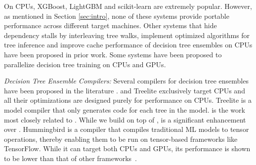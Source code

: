 On CPUs, XGBoost\cite{XGBoost}, LightGBM\cite{LightGBM} and
scikit-learn\cite{Sklearn} are extremely popular. However, 
as mentioned in Section \ref{sec:intro}, none of these systems
provide portable performance across different target machines.
Other systems that hide dependency stalls by interleaving tree walks\cite{VPred},
implement optimized algorithms for tree inference\cite{QuickScorer, QuickScorer1}
and improve cache performance of decision tree ensembles on CPUs\cite{CacheConscious1, CacheConscious2}
have been proposed in prior work.
Some systems have been proposed to parallelize decision tree training 
on CPUs and GPUs\cite{Jansson2014gpuRFAG, Nasridinov2013DecisionTC}.

\emph{Decision Tree Ensemble Compilers:}
Several compilers for decision tree ensembles have been proposed in the 
literature \cite{Treelite, Treebeard, Hummingbird}. \TreebeardOLD{} and Treelite
exclusively target CPUs and all their optimizations are designed purely for 
performance on CPUs. 
Treelite\cite{Treelite} is a model compiler that only  
generates  code for each tree in the model. 
\TreebeardOLD{} is the work most closely related to \Treebeard{}. While we 
build on top of \TreebeardOLD{}, \Treebeard{} is a significant enhancement 
over \TreebeardOLD{}. 
Hummingbird\cite{Hummingbird} is a compiler that compiles traditional ML models
to tensor operations, thereby enabling them to be run on tensor-based frameworks like
TensorFlow\cite{TensorFlow}. While it can target both CPUs
and GPUs, its performance is shown to be lower than that of other frameworks~\cite{Treebeard}.

